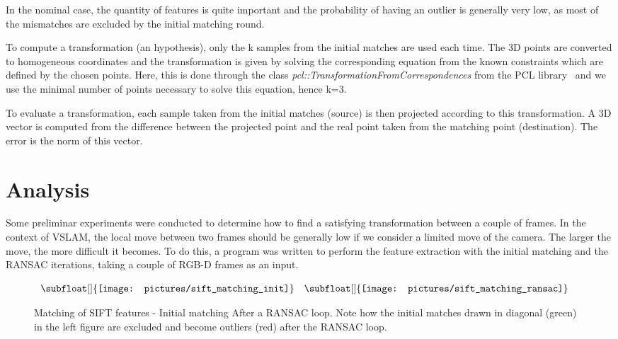 In the nominal case, the quantity of features is quite important and the probability of having an outlier is generally very low, as most of the mismatches are excluded by the initial matching round.


To compute a transformation (an hypothesis), only the k samples from the initial matches are used each time. The 3D points are converted to homogeneous coordinates and the transformation is given by solving the corresponding equation from the known constraints which are defined by the chosen points. Here, this is done through the class \emph{pcl::TransformationFromCorrespondences} from the \gls{PCL} library~\cite{Rusu_ICRA2011_PCL} and we use the minimal number of points necessary to solve this equation, hence k=3.

To evaluate a transformation, each sample taken from the initial matches (source) is then projected according to this transformation. A 3D vector is computed from the difference between the projected point and the real point taken from the matching point (destination). The error is the norm of this vector.

\section{Analysis}

Some preliminar experiments were conducted to determine how to find a satisfying transformation between a couple of frames. In the context of \gls{VSLAM}, the local move between two frames should be generally low if we consider a limited move of the camera. The larger the move, the more difficult it becomes. To do this, a program was written to perform the feature extraction with the initial matching and the RANSAC iterations, taking a couple of RGB-D frames as an input.

\begin{figure}[H]
\centering$
 \begin{array}{cc}
 \subfloat[]{\label{fig:sift_match_1} \texttt{[image: pictures/sift\_matching\_init]}} &
 \subfloat[]{\label{fig:sift_match_2} \texttt{[image: pictures/sift\_matching\_ransac]}}
 \end{array}$
\caption{Matching of SIFT features - \protect{} Initial matching \protect{} After a RANSAC loop. Note how the initial matches drawn in diagonal (green) in the left figure are excluded and become outliers (red) after the RANSAC loop.}
\end{figure}

